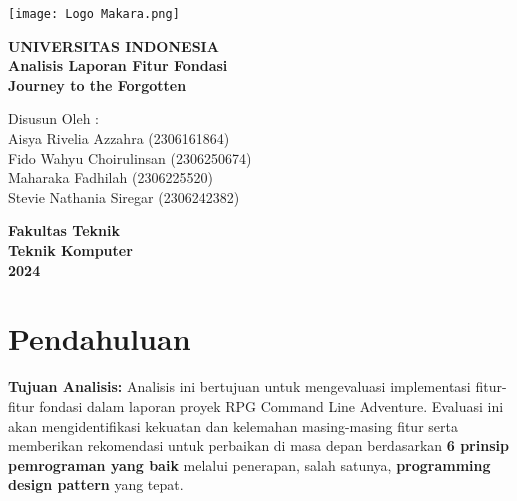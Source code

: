 \documentclass[12pt]{article}
\begin{document}
\begin{titlepage}
    \centering
    \texttt{[image: Logo Makara.png]} %
    \vspace{1cm}
    
    \centering
    \vspace*{1cm}

    \Huge \textbf{UNIVERSITAS INDONESIA} \\
    \vspace{0.5cm}
    \LARGE \textbf{Analisis Laporan Fitur Fondasi} \\
    \Huge \textbf{Journey to the Forgotten} \\
    
    \vspace{2cm}

    \Large
    Disusun Oleh : \\
    \vspace{0.5 cm}
    Aisya Rivelia Azzahra (2306161864) \\
    \vspace{0.5 cm}
    Fido Wahyu Choirulinsan (2306250674) \\
    \vspace{0.5 cm}
    Maharaka Fadhilah (2306225520) \\
    \vspace{0.5 cm}
    Stevie Nathania Siregar (2306242382) \\
    \vspace{0.5 cm}
    
    \vfill

    \LARGE
    \textbf{Fakultas Teknik} \\
    \textbf{Teknik Komputer} \\
    \textbf{2024} \\
\end{titlepage}

\section{Pendahuluan}
\textbf{Tujuan Analisis:} Analisis ini bertujuan untuk mengevaluasi implementasi fitur-fitur fondasi dalam laporan proyek RPG Command Line Adventure. Evaluasi ini akan mengidentifikasi kekuatan dan kelemahan masing-masing fitur serta memberikan rekomendasi untuk perbaikan di masa depan berdasarkan \textbf{6 prinsip pemrograman yang baik} melalui penerapan, salah satunya, \textbf{programming design pattern} yang tepat.
\end{document}
